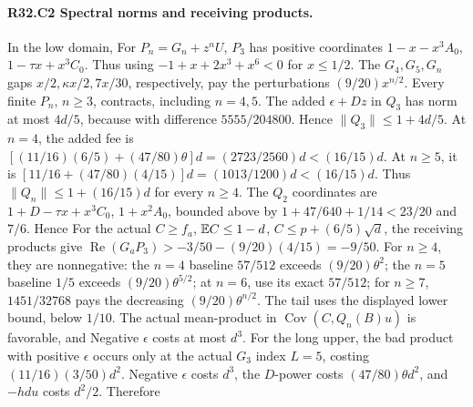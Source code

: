 \paragraph{R32.C2 Spectral norms and receiving products.}
In the low domain,
For \(P_n=G_n+z^nU\), \(P_3\) has positive coordinates
\(1-x-x^3A_0\), \(1-\tau x+x^3C_0\). Thus
using \(-1+x+2x^3+x^6<0\) for \(x\le1/2\). The \(G_4,\allowbreak G_5,\allowbreak G_n\)
gaps \(x/2,\allowbreak \kappa x/2,\allowbreak 7x/30\), respectively, pay the perturbations
\((9/20)x^{n/2}\). Every finite \(P_n\), \(n\ge3\), contracts, including \(n=4,\allowbreak 5\).
The added \(\epsilon+Dz\) in \(Q_3\) has norm at most \(4d/5\), because
with difference \(5555/204800\). Hence \(\lVert Q_3\rVert\le1+4d/5\).
At \(n=4\), the added fee is
\([(11/16)(6/5)+(47/80)\theta]d=(2723/2560)d<(16/15)d\).
At \(n\ge5\), it is
\([11/16+(47/80)(4/15)]d=(1013/1200)d<(16/15)d\).
Thus \(\lVert Q_n\rVert\le1+(16/15)d\) for every \(n\ge4\).
The \(Q_2\) coordinates are \(1+D-\tau x+x^3C_0\), \(1+x^2A_0\),
bounded above by \(1+47/640+1/14<23/20\) and \(7/6\). Hence
For the actual \(C\ge f_a\), \(\mathbb E C\le1-d\), \(C\le p+(6/5)\sqrt d\),
the receiving products give
\(\operatorname{Re}(G_aP_3)>-3/50-(9/20)(4/15)=-9/50\).
For \(n\ge4\), they are nonnegative: the \(n=4\) baseline \(57/512\)
exceeds \((9/20)\theta^2\); the \(n=5\) baseline \(1/5\) exceeds
\((9/20)\theta^{5/2}\); at \(n=6\), use its exact \(57/512\); for
\(n\ge7\), \(1451/32768\) pays the decreasing \((9/20)\theta^{n/2}\).
The tail uses the displayed lower bound, below \(1/10\).
The actual mean-product in \(\operatorname{Cov}(C,\allowbreak Q_n(B)u)\) is favorable,
and
Negative \(\epsilon\) costs at most \(d^3\). For the long upper, the bad
product with positive \(\epsilon\) occurs only at the actual \(G_3\) index
\(L=5\), costing \((11/16)(3/50)d^2\). Negative \(\epsilon\) costs
\(d^3\), the \(D\)-power costs \((47/80)\theta d^2\), and \(-hdu\)
costs \(d^2/2\). Therefore

